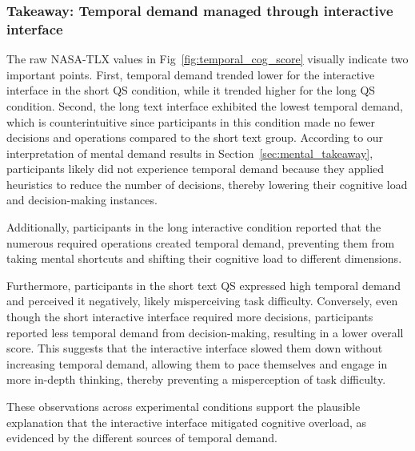 \subsubsection{Takeaway: Temporal demand managed through interactive interface}
The raw NASA-TLX values in Fig~\ref{fig:temporal_cog_score} visually indicate two important points. First, temporal demand trended lower for the interactive interface in the short QS condition, while it trended higher for the long QS condition. Second, the long text interface exhibited the lowest temporal demand, which is counterintuitive since participants in this condition made no fewer decisions and operations compared to the short text group. According to our interpretation of mental demand results in Section~\ref{sec:mental_takeaway}, participants likely did not experience temporal demand because they applied heuristics to reduce the number of decisions, thereby lowering their cognitive load and decision-making instances.

Additionally, participants in the long interactive condition reported that the numerous required operations created temporal demand, preventing them from taking mental shortcuts and shifting their cognitive load to different dimensions.

Furthermore, participants in the short text QS expressed high temporal demand and perceived it negatively, likely misperceiving task difficulty. Conversely, even though the short interactive interface required more decisions, participants reported less temporal demand from decision-making, resulting in a lower overall score. This suggests that the interactive interface slowed them down without increasing temporal demand, allowing them to pace themselves and engage in more in-depth thinking, thereby preventing a misperception of task difficulty.

These observations across experimental conditions support the plausible explanation that the interactive interface mitigated cognitive overload, as evidenced by the different sources of temporal demand.



